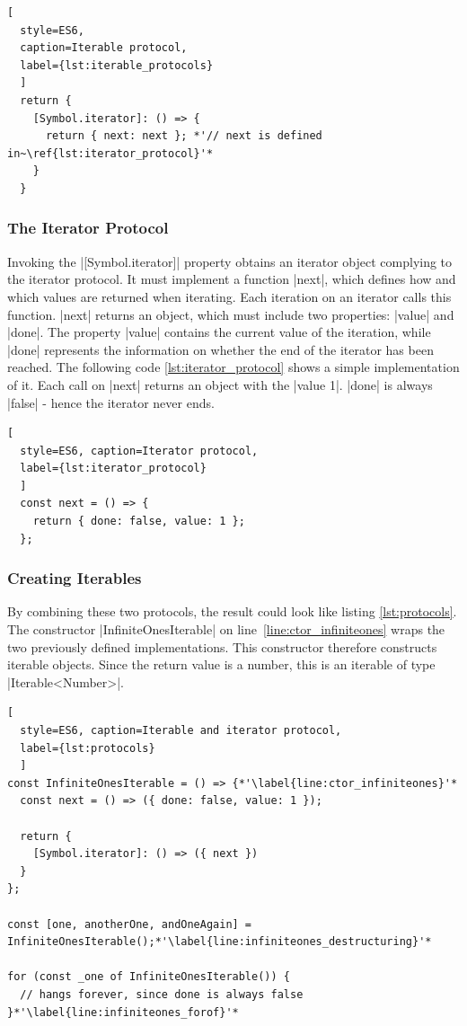 \begin{lstlisting}[
  style=ES6, 
  caption=Iterable protocol,
  label={lst:iterable_protocols}
  ]
  return {
    [Symbol.iterator]: () => {
      return { next: next }; *'// next is defined in~\ref{lst:iterator_protocol}'*
    }
  }
\end{lstlisting}

\subsubsection{The Iterator Protocol}
\label{subsub:The Iterator Protocol}
Invoking the |[Symbol.iterator]| property obtains an iterator object
complying to the iterator protocol. It must implement a function |next|, which
defines how and which values are returned when iterating. Each iteration on an
iterator calls this function. |next| returns an object, which must
include two properties: |value| and |done|. The property |value|
contains the current value of the iteration, while |done| represents the
information on whether the end of the iterator has been reached. The following
code \ref{lst:iterator_protocol} shows a simple implementation of it. Each call
on |next| returns an object with the |value 1|. |done| is always |false| -
hence the iterator never ends. 

\begin{lstlisting}[
  style=ES6, caption=Iterator protocol,
  label={lst:iterator_protocol}
  ]
  const next = () => {
    return { done: false, value: 1 };
  };
\end{lstlisting}

\subsubsection{Creating Iterables}
\label{subsub:Creating Iterables}
By combining these two protocols, the result could look like listing
\ref{lst:protocols}. The constructor |InfiniteOnesIterable| on
line~\ref{line:ctor_infiniteones} wraps the two
previously defined implementations. This constructor therefore constructs
iterable objects. Since the return value is a number, this is an
iterable of type |Iterable<Number>|.

\begin{lstlisting}[
  style=ES6, caption=Iterable and iterator protocol,
  label={lst:protocols}
  ]
const InfiniteOnesIterable = () => {*'\label{line:ctor_infiniteones}'*
  const next = () => ({ done: false, value: 1 });

  return {
    [Symbol.iterator]: () => ({ next })
  }
};

const [one, anotherOne, andOneAgain] = InfiniteOnesIterable();*'\label{line:infiniteones_destructuring}'*

for (const _one of InfiniteOnesIterable()) { 
  // hangs forever, since done is always false
}*'\label{line:infiniteones_forof}'*
\end{lstlisting}

